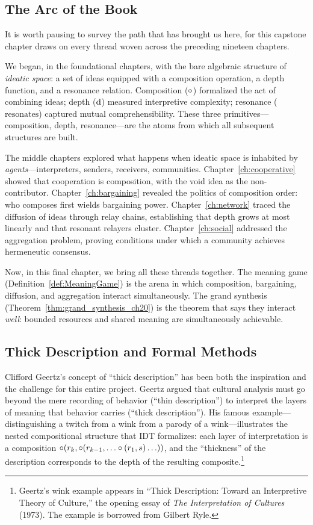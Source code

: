 \subsection{The Arc of the Book}

It is worth pausing to survey the path that has brought us here, for this
capstone chapter draws on every thread woven across the preceding nineteen
chapters.

We began, in the foundational chapters, with the bare algebraic structure
of \emph{ideatic space}: a set of ideas equipped with a composition
operation, a depth function, and a resonance relation.  Composition
($\circ$) formalized the act of combining ideas; depth ($\operatorname{d}$)
measured interpretive complexity; resonance ($\text{resonates}$) captured
mutual comprehensibility.  These three primitives---composition, depth,
resonance---are the atoms from which all subsequent structures are built.

The middle chapters explored what happens when ideatic space is inhabited
by \emph{agents}---interpreters, senders, receivers, communities.
Chapter~\ref{ch:cooperative} showed that cooperation is composition,
with the void idea as the non-contributor.
Chapter~\ref{ch:bargaining} revealed the politics of composition order:
who composes first wields bargaining power.  Chapter~\ref{ch:network}
traced the diffusion of ideas through relay chains, establishing that
depth grows at most linearly and that resonant relayers cluster.
Chapter~\ref{ch:social} addressed the aggregation problem, proving
conditions under which a community achieves hermeneutic consensus.

Now, in this final chapter, we bring all these threads together.  The
meaning game (Definition~\ref{def:MeaningGame}) is the arena in which
composition, bargaining, diffusion, and aggregation interact simultaneously.
The grand synthesis (Theorem~\ref{thm:grand_synthesis_ch20}) is the
theorem that says they interact \emph{well}: bounded resources and shared
meaning are simultaneously achievable.

\subsection{Thick Description and Formal Methods}

Clifford Geertz's concept of ``thick description'' has been both the
inspiration and the challenge for this entire project.  Geertz argued that
cultural analysis must go beyond the mere recording of behavior (``thin
description'') to interpret the layers of meaning that behavior carries
(``thick description'').  His famous example---distinguishing a twitch from
a wink from a parody of a wink---illustrates the nested compositional
structure that IDT formalizes: each layer of interpretation is a composition
$\circ(r_k, \circ(r_{k-1}, \ldots \circ(r_1, s) \ldots))$, and
the ``thickness'' of the description corresponds to the depth of the
resulting composite.\footnote{Geertz's wink example appears in ``Thick
Description: Toward an Interpretive Theory of Culture,'' the opening essay
of \textit{The Interpretation of Cultures} (1973).  The example is borrowed
from Gilbert Ryle.}

